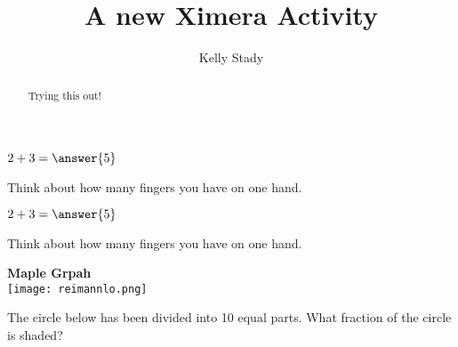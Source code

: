 \documentclass{ximera}
\title{A new Ximera Activity}
\author{Kelly Stady}
\begin{document}
\begin{abstract}
    Trying this out!
\end{abstract}
\maketitle


\begin{question}
    $2+3=\answer{5}$

\begin{hint}
Think about how many fingers you have on one hand.
\end{hint}

\end{question}

\begin{question}
  \(2 + 3 = \answer{5}\)

  \begin{hint}
    Think about how many fingers you have on one hand.
  \end{hint}
\end{question}


\begin{center} %
\textbf{Maple Grpah} \\

    \texttt{[image: reimannlo.png]}
\end{center}


\begin{question}
 The circle below has been divided into 10 equal parts.  What fraction of the circle is shaded? \\ \\


\begin{center} 
\hspace{0.8in} 
\end{center}

\begin{multipleChoice}
\end{multipleChoice}

\end{question}
\end{document}
